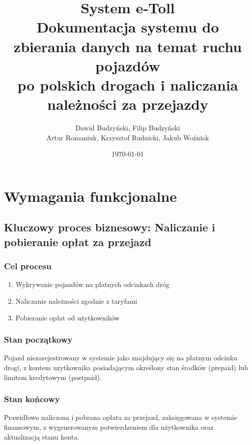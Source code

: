 \documentclass[12pt]{article}
\title{System e-Toll \\
\large Dokumentacja systemu do zbierania danych na temat ruchu pojazdów\\po polskich drogach i naliczania należności za przejazdy}
\author{Dawid Budzyński, Filip Budzyński \\ Artur Romaniuk, Krzysztof Rudnicki, Jakub Woźniak}
\date{\today}
\begin{document}
\maketitle

\section{Wymagania funkcjonalne}

\subsection{Kluczowy proces biznesowy: Naliczanie i pobieranie opłat za przejazd}

\subsubsection{Cel procesu}
\begin{enumerate}
    \item Wykrywanie pojazdów na płatnych odcinkach dróg
    \item Naliczanie należności zgodnie z taryfami
    \item Pobieranie opłat od użytkowników
\end{enumerate}

\subsubsection{Stan początkowy}
Pojazd niezarejestrowany w systemie jako znajdujący się na płatnym odcinku drogi, z kontem użytkownika posiadającym określony stan środków (prepaid) lub limitem kredytowym (postpaid).

\subsubsection{Stan końcowy}
Prawidłowo naliczona i pobrana opłata za przejazd, zaksięgowana w systemie finansowym, z wygenerowanym potwierdzeniem dla użytkownika oraz aktualizacją stanu konta.
\end{document}
